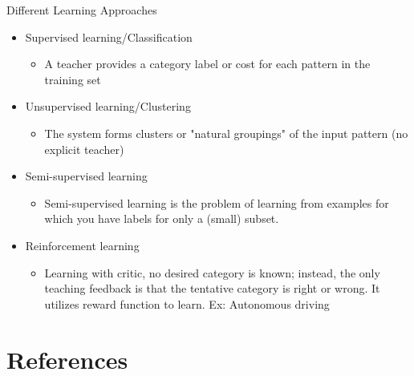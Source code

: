 \begin{frame}{Different Learning Approaches}
\begin{itemize}
\setlength{\itemsep}{8pt}
\item {\color{mycolor2}Supervised learning/Classification}
\begin{itemize}
\item A teacher provides a category label or cost for each pattern in the training set
\end{itemize}
\item {\color{mycolor2}Unsupervised learning/Clustering}
\begin{itemize}
\item The system forms clusters or "natural groupings" of the input pattern (no explicit teacher)
\end{itemize}
\item {\color{mycolor2}Semi-supervised learning}
\begin{itemize}
\item Semi-supervised learning is the problem of learning from examples for which you have labels for only a (small) subset.
\end{itemize}
\item {\color{mycolor2}Reinforcement learning}
\begin{itemize}
\item Learning with critic, no desired category is known; instead, the only teaching feedback is that the tentative category is right or wrong. It utilizes reward function to learn. Ex: Autonomous driving
\end{itemize}
\end{itemize}
\end{frame}

\section{References}
